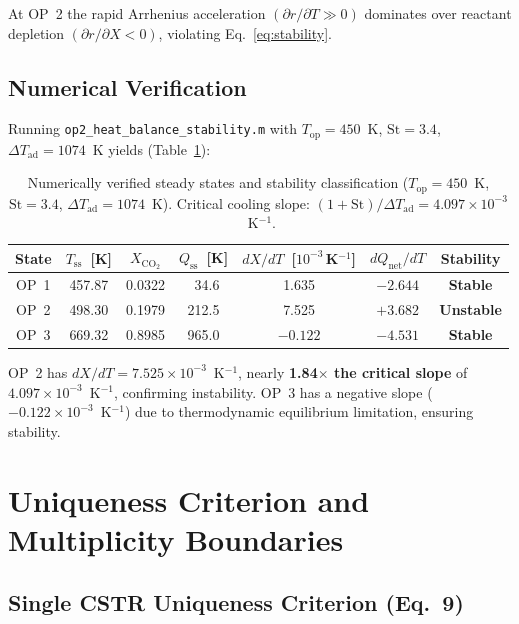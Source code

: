 \documentclass[11pt,a4paper]{article}
\newcommand{\dTad}{\Delta T_{\mathrm{ad}}}
\newcommand{\Xco}{X_{\mathrm{CO_2}}}
\newcommand{\Top}{T_{\mathrm{op}}}
\newcommand{\St}{\mathrm{St}}
\begin{document}
At OP~2 the rapid Arrhenius acceleration $(\partial r/\partial T \gg 0)$
dominates over reactant depletion $(\partial r/\partial X < 0)$, violating
Eq.~\eqref{eq:stability}.

\subsection{Numerical Verification}
\label{sec:numverif}

Running \texttt{op2\_heat\_balance\_stability.m} with
$\Top=450$~K, $\St=3.4$, $\dTad=1074$~K yields (Table~\ref{tab:opverif}):

\begin{table}[h!]
\centering
\caption{Numerically verified steady states and stability classification
         ($\Top=450$~K, $\St=3.4$, $\dTad=1074$~K).
         Critical cooling slope: $(1+\St)/\dTad = 4.097\times10^{-3}$~K$^{-1}$.}
\label{tab:opverif}
\renewcommand{\arraystretch}{1.2}
\begin{tabular}{@{}ccccccc@{}}
\toprule
State & $T_{\mathrm{ss}}$~[K] & $\Xco$ & $Q_{\mathrm{ss}}$~[K]
      & $dX/dT$~[$10^{-3}$\,K$^{-1}$]
      & $dQ_{\mathrm{net}}/dT$ & Stability \\
\midrule
OP~1 & 457.87 & 0.0322 & ~34.6 & 1.635 & $-2.644$ & \textcolor{blue!70!black}{\textbf{Stable}} \\
OP~2 & 498.30 & 0.1979 & 212.5 & 7.525 & $+3.682$ & \textcolor{red!70!black}{\textbf{Unstable}} \\
OP~3 & 669.32 & 0.8985 & 965.0 & $-0.122$ & $-4.531$ & \textcolor{blue!70!black}{\textbf{Stable}} \\
\bottomrule
\end{tabular}
\end{table}

OP~2 has $dX/dT = 7.525\times10^{-3}$~K$^{-1}$, nearly
\textbf{1.84$\times$ the critical slope} of $4.097\times10^{-3}$~K$^{-1}$,
confirming instability.  OP~3 has a negative slope ($-0.122\times10^{-3}$~K$^{-1}$)
due to thermodynamic equilibrium limitation, ensuring stability.

\section{Uniqueness Criterion and Multiplicity Boundaries}
\label{sec:uniqueness}

\subsection{Single CSTR Uniqueness Criterion (Eq.~9)}
\end{document}
